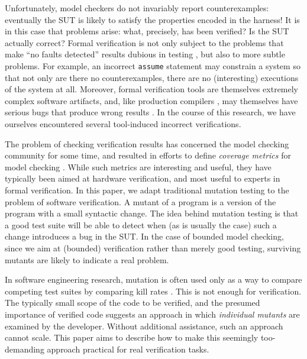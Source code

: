 \documentclass{svjour3}
\begin{document}
Unfortunately, model checkers do not invariably report
counterexamples: eventually the SUT is likely to satisfy the
properties encoded in the harness!  It is in this case that problems
arise: what, precisely, has been verified?  Is the SUT actually correct?
Formal verification is not only subject to the problems that make
``no faults detected'' results dubious in testing \cite{WODA09,CovDisc}, but
also to more subtle problems.  For example, an incorrect {\tt assume}
statement may constrain a system so that not only are there no
counterexamples, there are no (interesting) executions of the system at
all.  Moreover, formal verification tools are themselves extremely
complex software artifacts, and, like production compilers \cite{csmith}, may
themselves have serious bugs that produce wrong results
\cite{statanalbug}.  In the course of this research, we have ourselves
encountered several tool-induced incorrect verifications.

The problem of checking verification results has concerned the model checking community for some time, and resulted in efforts to define \emph{coverage
  metrics} for model checking \cite{Hoskote,PracticalCov}.  While such metrics are interesting and
useful, they have typically been aimed at hardware
verification, and most useful to experts in
formal verification.  In this paper, we adapt traditional mutation
testing \cite{mutation1,mutation2} to the problem of software
verification.  A mutant of a program is a version of the program with
a small syntactic change.  The idea behind mutation testing
is that a good test suite will be able to detect when (as is usually
the case) such a change introduces a bug in the SUT.  In the case of
bounded model checking, since we aim at (bounded) verification rather
than merely good testing, surviving mutants are
likely to indicate a real problem.

In software engineering research, mutation is often used only as a way
to compare competing test suites by comparing kill rates \cite{ISSTA13,TOSEM14}.  This is
not enough for verification.  The typically small scope of the code to
be verified, and the presumed importance of verified code
suggests an approach in which \emph{individual mutants}
are examined by the developer.  Without additional assistance, such an
approach cannot scale.  This paper aims to describe how to make this
seemingly too-demanding approach practical for real verification
tasks.
\end{document}
